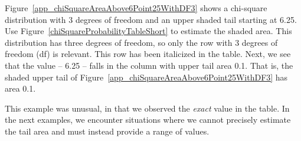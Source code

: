 \begin{examplewrap}
\begin{nexample}{Figure~\ref{app_chiSquareAreaAbove6Point25WithDF3}
    shows a chi-square distribution with 3 degrees of freedom
    and an upper shaded tail starting at 6.25.
    Use Figure~\ref{chiSquareProbabilityTableShort}
    to estimate the shaded area.}
  This distribution has three degrees of freedom,
  so only the row with 3 degrees of freedom (df) is relevant.
  This row has been italicized in the table.
  Next, we see that the value -- 6.25 -- falls in the column
  with upper tail area 0.1.
  That is, the shaded upper tail of
  Figure~\ref{app_chiSquareAreaAbove6Point25WithDF3}
  has area 0.1.

  This example was unusual, in that we observed the
  \emph{exact} value in the table.
  In the next examples, we encounter situations where
  we cannot precisely estimate the tail area and must
  instead provide a range of values.
\end{nexample}
\end{examplewrap}

